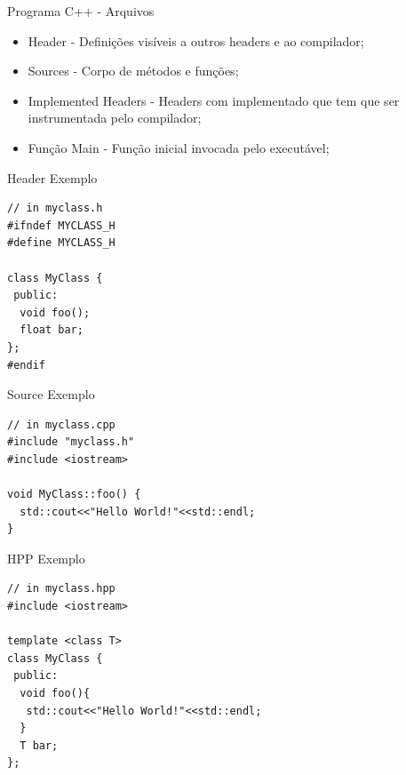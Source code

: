 \documentclass[12pt,table,xcolor={dvipsnames}]{beamer}
\begin{document}
\begin{frame}{Programa C++ - Arquivos}
\begin{itemize}
\item Header - Definições visíveis a outros headers e ao compilador;
\item Sources - Corpo de métodos e funções;
\item Implemented Headers - Headers com implementado que tem que ser instrumentada pelo compilador;
\item Função Main - Função inicial invocada pelo executável;
\end{itemize}
\end{frame}

\begin{frame}[fragile]{Header Exemplo}
\begin{lstlisting}
// in myclass.h
#ifndef MYCLASS_H
#define MYCLASS_H

class MyClass {
 public:
  void foo();
  float bar;
};
#endif 
\end{lstlisting}
\end{frame}

\begin{frame}[fragile]{Source Exemplo}
\begin{lstlisting}
// in myclass.cpp
#include "myclass.h"
#include <iostream>

void MyClass::foo() {
  std::cout<<"Hello World!"<<std::endl;
}
\end{lstlisting}
\end{frame}


\begin{frame}[fragile]{HPP Exemplo}
\begin{lstlisting}
// in myclass.hpp
#include <iostream>

template <class T>
class MyClass {
 public:
  void foo(){
   std::cout<<"Hello World!"<<std::endl;
  }
  T bar;
};
\end{lstlisting}
\end{frame}
\end{document}
